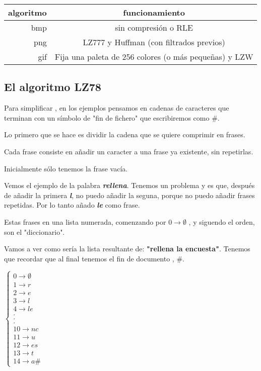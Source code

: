 		\begin{table}[h]
			\centering
			\begin{tabular}{r|c}
			algoritmo & funcionamiento \\ \hline
			bmp & sin compresión o RLE \\
			png & LZ777 y Huffman (con filtrados previos) \\
			gif & Fija una paleta de 256 colores (o más pequeñas) y LZW \\
			\end{tabular}
		\end{table}


	\subsection{El algoritmo LZ78}

	Para simplificar , en los ejemplos pensamos en cadenas de caracteres que terminan con un símbolo de "fin de fichero" que escribiremos como \#.

	Lo primero que se hace es dividir la cadena que se quiere comprimir en frases.

	Cada frase consiste en añadir un caracter a una frase ya existente, sin repetirlas.

	Inicialmente sólo tenemos la frase vacía.

	Vemos el ejemplo de la palabra \textbf{\textit{rellena}}. Tenemos un problema y es que, después de añadir la primera \textbf{\textit{l}}, no puedo añadir la seguna, porque no puedo añadir frases repetidas. Por lo tanto añado \textbf{\textit{le}} como frase.

	Estas frases en una lista numerada, comenzando por $0 \rightarrow \emptyset$ , y siguendo el orden, son el "diccionario".

	\begin{example}
		Vamos a ver como sería la lista resultante de: \textbf{"rellena la encuesta"}. Tenemos que recordar que al final tenemos el fin de documento , \#.


		$\begin{cases}
			0 \rightarrow \emptyset\\
			1\rightarrow r\\
			2 \rightarrow e\\
			3\rightarrow l\\
			4 \rightarrow le\\
			.\\
			.\\
			.\\
			10 \rightarrow nc\\
			11\rightarrow u\\
			12 \rightarrow es\\
			13 \rightarrow t\\
			14 \rightarrow a\#
		\end{cases}$

	\end{example}


